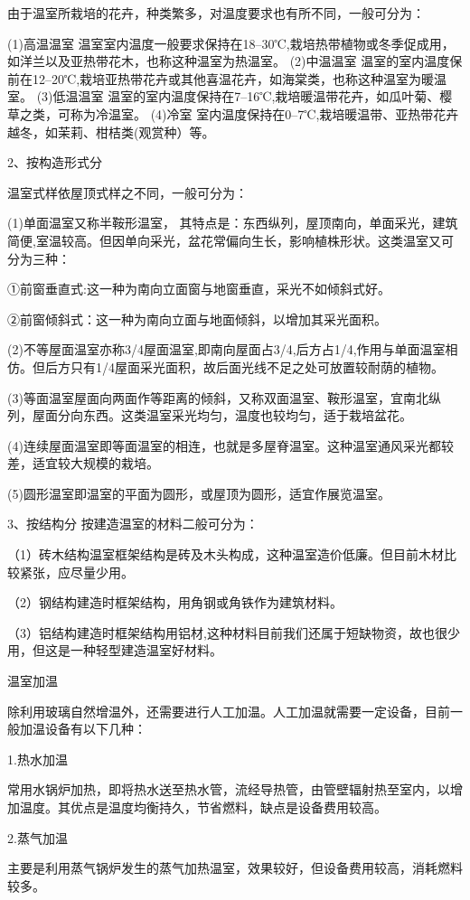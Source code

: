 \documentclass{ctexbook}
\begin{document}
由于温室所栽培的花卉，种类繁多，对温度要求也有所不同，一般可分为：

(1)高温温室 温室室内温度一般要求保持在18--30℃,栽培热带植物或冬季促成用，如洋兰以及亚热带花木，也称这种温室为热温室。
(2)中温温室 温室的室内温度保前在12--20℃,栽培亚热带花卉或其他喜温花卉，如海棠类，也称这种温室为暖温室。
(3)低温温室 温室的室内温度保持在7--16℃,栽培暖温带花卉，如瓜叶菊、樱草之类，可称为冷温室。
(4)冷室 室内温度保持在0--7℃,栽培暖温带、亚热带花卉越冬，如茉莉、柑桔类(观赏种）等。

2、按构造形式分

温室式样依屋顶式样之不同，一般可分为：

(1)单面温室又称半鞍形温室，
其特点是：东西纵列，屋顶南向，单面采光，建筑简便,室温较高。但因单向采光，盆花常偏向生长，影响植株形状。这类温室又可分为三种：

①前窗垂直式:这一种为南向立面窗与地窗垂直，采光不如倾斜式好。

②前窗倾斜式：这一种为南向立面与地面倾斜，以增加其采光面积。

(2)不等屋面温室亦称3/4屋面温室,即南向屋面占3/4,后方占1/4,作用与单面温室相仿。但后方只有1/4屋面采光面积，故后面光线不足之处可放置较耐荫的植物。

(3)等面温室屋面向两面作等距离的倾斜，又称双面温室、鞍形温室，宜南北纵列，屋面分向东西。这类温室采光均匀，温度也较均匀，适于栽培盆花。

(4)连续屋面温室即等面温室的相连，也就是多屋脊温室。这种温室通风采光都较差，适宜较大规模的栽培。

(5)圆形温室即温室的平面为圆形，或屋顶为圆形，适宜作展览温室。

3、按结构分
按建造温室的材料二般可分为：

（1）砖木结构温室框架结构是砖及木头构成，这种温室造价低廉。但目前木材比较紧张，应尽量少用。

（2）钢结构建造时框架结构，用角钢或角铁作为建筑材料。

（3）铝结构建造时框架结构用铝材,这种材料目前我们还属于短缺物资，故也很少用，但这是一种轻型建造温室好材料。

温室加温

除利用玻璃自然增温外，还需要进行人工加温。人工加温就需要一定设备，目前一般加温设备有以下几种：

1.热水加温

常用水锅炉加热，即将热水送至热水管，流经导热管，由管壁辐射热至室内，以增加温度。其优点是温度均衡持久，节省燃料，缺点是设备费用较高。

2.蒸气加温

主要是利用蒸气锅炉发生的蒸气加热温室，效果较好，但设备费用较高，消耗燃料较多。
\end{document}
